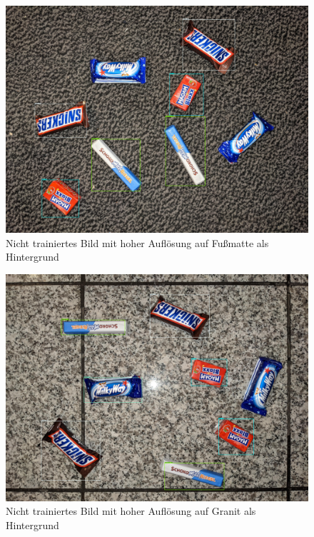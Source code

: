     \begin{figure}[H]
        \centering
        \includegraphics[angle = 90, width = \textwidth]{Bilder/models/model_comparison/faster_rcnn_resnet50_v1_640x640_coco17_tpu-8/HD_on_doormat.jpg}
        \caption{Nicht trainiertes Bild mit hoher Auflösung auf Fußmatte als Hintergrund}
    \end{figure}
    
    \begin{figure}[H]
        \centering
        \includegraphics[angle = 90, width = \textwidth]{Bilder/models/model_comparison/faster_rcnn_resnet50_v1_640x640_coco17_tpu-8/HD_on_granite.jpg}
        \caption{Nicht trainiertes Bild mit hoher Auflösung auf Granit als Hintergrund}
    \end{figure}
    
